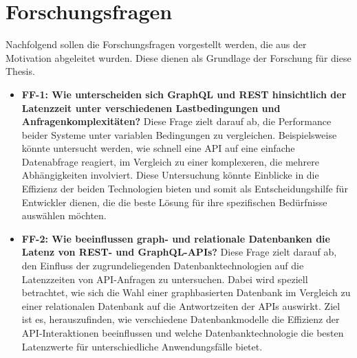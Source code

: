 \section{Forschungsfragen} %
\label{sec:forschungsfragen}
Nachfolgend sollen die Forschungsfragen vorgestellt werden, die aus der Motivation abgeleitet wurden. Diese dienen als Grundlage der Forschung für diese Thesis.
\newpage
\begin{itemize}
	\item \textbf{FF-1: Wie unterscheiden sich GraphQL und REST hinsichtlich der Latenzzeit unter verschiedenen Lastbedingungen und Anfragenkomplexitäten?}  Diese Frage zielt darauf ab, die Performance beider Systeme unter variablen Bedingungen zu vergleichen. Beispielsweise könnte untersucht werden, wie schnell eine API auf eine einfache Datenabfrage reagiert, im Vergleich zu einer komplexeren, die mehrere Abhängigkeiten involviert. Diese Untersuchung könnte Einblicke in die Effizienz der beiden Technologien bieten und somit als Entscheidungshilfe für Entwickler dienen, die die beste Lösung für ihre spezifischen Bedürfnisse auswählen möchten.
	\item \textbf{FF-2: Wie beeinflussen graph- und relationale Datenbanken die Latenz von REST- und GraphQL-APIs?} Diese Frage zielt darauf ab, den Einfluss der zugrundeliegenden Datenbanktechnologien auf die Latenzzeiten von API-Anfragen zu untersuchen. Dabei wird speziell betrachtet, wie sich die Wahl einer graphbasierten Datenbank im Vergleich zu einer relationalen Datenbank auf die Antwortzeiten der APIs auswirkt. Ziel ist es, herauszufinden, wie verschiedene Datenbankmodelle die Effizienz der API-Interaktionen beeinflussen und welche Datenbanktechnologie die besten Latenzwerte für unterschiedliche Anwendungsfälle bietet.
\end{itemize}
